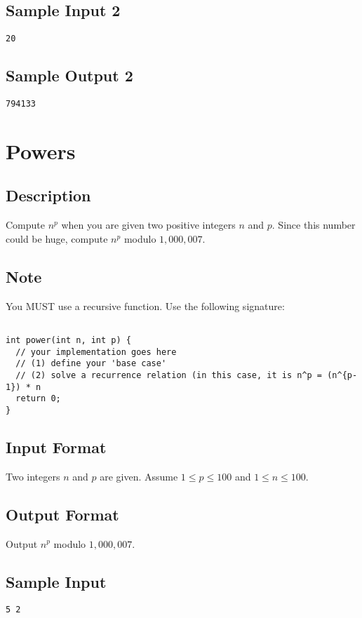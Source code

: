 \subsection*{Sample Input 2}
\begin{verbatim}
20
\end{verbatim}

\subsection*{Sample Output 2}
\begin{verbatim}
794133
\end{verbatim}



\newpage

\section{Powers}

\subsection*{Description}
Compute $n^p$ when you are given two positive integers $n$ and $p$. Since this number could be huge, compute $n^p$ modulo $1,000,007$. 

\subsection*{Note}
You MUST use a recursive function. Use the following signature:
\begin{verbatim}

int power(int n, int p) {
  // your implementation goes here
  // (1) define your 'base case'
  // (2) solve a recurrence relation (in this case, it is n^p = (n^{p-1}) * n
  return 0;
}
\end{verbatim}

\subsection*{Input Format}
Two integers $n$ and $p$ are given. Assume $1\leq p \leq 100$ and $1 \leq n \leq 100$.

\subsection*{Output Format}
Output $n^p$ modulo $1,000,007$. 

\subsection*{Sample Input}
\begin{verbatim}
5 2
\end{verbatim}

